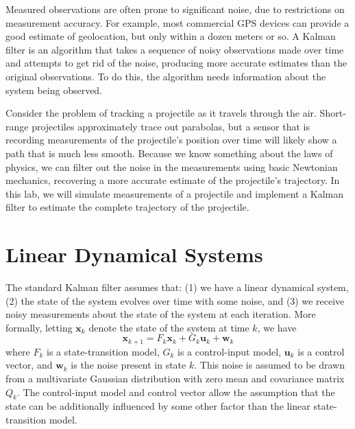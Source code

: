 
Measured observations are often prone to significant noise, due to restrictions on measurement accuracy.
For example, most commercial GPS devices can provide a good estimate of geolocation, but only within a dozen meters or so.
A Kalman filter is an algorithm that takes a sequence of noisy observations made over time and attempts to get rid of the noise, producing more accurate estimates than the original observations.
To do this, the algorithm needs information about the system being observed.

Consider the problem of tracking a projectile as it travels through the air.
Short-range projectiles approximately trace out parabolas, but a sensor that is recording measurements of the projectile's position over time will likely show a path that is much less smooth.
Because we know something about the laws of physics, we can filter out the noise in the measurements using basic Newtonian mechanics, recovering a more accurate estimate of the projectile's trajectory.
In this lab, we will simulate measurements of a projectile and implement a Kalman filter to estimate the complete trajectory of the projectile.

\section*{Linear Dynamical Systems}
The standard Kalman filter assumes that:
(1) we have a linear dynamical system,
(2) the state of the system evolves over time with some noise, and
(3) we receive noisy measurements about the state of the system at each iteration.
More formally, letting $\mathbf{x}_{k}$ denote the state of the system at time $k$, we have
\begin{equation}
\mathbf{x}_{k+1} = F_{k} \mathbf{x}_{k} + G_{k}\mathbf{u}_{k} + \mathbf{w}_{k}
\label{eq:state}
\end{equation}
where $F_{k}$ is a state-transition model, $G_{k}$ is a control-input model, $\mathbf{u}_{k}$ is a control vector, and $\mathbf{w}_{k}$ is the noise present in state $k$.
This noise is assumed to be drawn from a multivariate Gaussian distribution with zero mean and covariance matrix $Q_{k}$.
The control-input model and control vector allow the assumption that the state can be additionally influenced by some other factor than the linear state-transition model.

